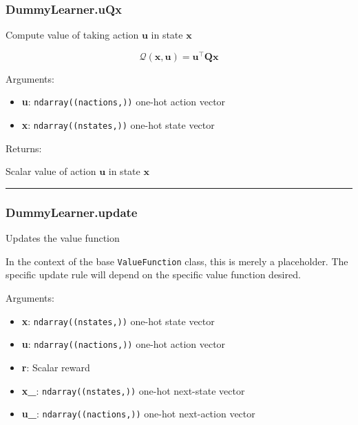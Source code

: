 \subsubsection{DummyLearner.uQx}\label{dummylearner.uqx}

\begin{Shaded}
\begin{Highlighting}[]
\end{Highlighting}
\end{Shaded}

Compute value of taking action \(\mathbf u\) in state \(\mathbf x\)

\[
\mathcal Q(\mathbf x, \mathbf u) = \mathbf u^\top \mathbf Q \mathbf x
\]

Arguments:

\begin{itemize}
\tightlist
\item
  \textbf{u}: \texttt{ndarray((nactions,))} one-hot action vector
\item
  \textbf{x}: \texttt{ndarray((nstates,))} one-hot state vector
\end{itemize}

Returns:

Scalar value of action \(\mathbf u\) in state \(\mathbf x\)

\begin{center}\rule{0.5\linewidth}{\linethickness}\end{center}

\subsubsection{DummyLearner.update}\label{dummylearner.update}

\begin{Shaded}
\begin{Highlighting}[]
\end{Highlighting}
\end{Shaded}

Updates the value function

In the context of the base \texttt{ValueFunction} class, this is merely
a placeholder. The specific update rule will depend on the specific
value function desired.

Arguments:

\begin{itemize}
\tightlist
\item
  \textbf{x}: \texttt{ndarray((nstates,))} one-hot state vector
\item
  \textbf{u}: \texttt{ndarray((nactions,))} one-hot action vector
\item
  \textbf{r}: Scalar reward
\item
  \textbf{x\_}: \texttt{ndarray((nstates,))} one-hot next-state vector
\item
  \textbf{u\_}: \texttt{ndarray((nactions,))} one-hot next-action vector
\end{itemize}

